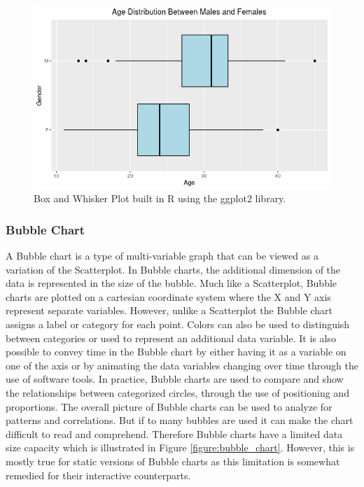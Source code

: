\begin{figure}[H]
    \centering
        \includegraphics[scale=0.4]{figures/box_and_whisker.png}
    \caption{Box and Whisker Plot built in R using the ggplot2 library.}
    \label{figure:box_and_whisker}
\end{figure} 

\subsubsection{Bubble Chart}
A Bubble chart is a type of multi-variable graph that can be viewed as a variation 
of the Scatterplot. In Bubble charts, the additional dimension of the data is represented 
in the size of the bubble. Much like a Scatterplot, Bubble charts are plotted on 
a cartesian coordinate system where the X and Y axis represent separate variables. 
However, unlike a Scatterplot the Bubble chart assigns a label or category for
each point. Colors can also be used to distinguish between categories or used to 
represent an additional data variable. It is also possible to convey time in the
Bubble chart by either having it as a variable on one of the axis or by animating 
the data variables changing over time through the use of software tools. In practice,
Bubble charts are used to compare and show the relationships between categorized 
circles, through the use of positioning and proportions. The overall picture of 
Bubble charts can be used to analyze for patterns and correlations. But if to many bubbles 
are used it can make the chart difficult to read and comprehend. Therefore Bubble 
charts have a limited data size capacity which is illustrated in Figure \ref{figure:bubble_chart}.  
However, this is mostly true for static versions of Bubble charts as this limitation 
is somewhat remedied for their interactive counterparts. 

